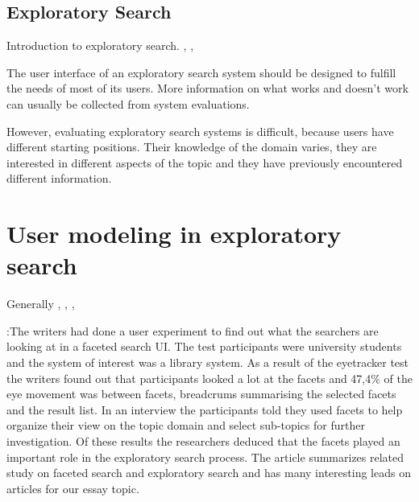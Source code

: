 \documentclass{sigchi}
\begin{document}
\subsection{Exploratory Search}
Introduction to exploratory search.
\cite{march06}, \cite{white09}, \cite{tvaro11}



The user interface of an exploratory search system should be designed to fulfill the needs of most of its users. More information on what works and doesn't work can usually be collected from system evaluations.

However, evaluating exploratory search systems is difficult, because users have different starting positions. Their knowledge of the domain varies, they are interested in different aspects of the topic and they have previously encountered different information. \cite{kules08}

\section{User modeling in exploratory search}
Generally
\cite{oconnor10}, \cite{sugi04}, \cite{white07}, \cite{kules09}

\cite{kules09}:The writers had done a user experiment to find out what  the searchers are  looking at in a faceted search UI. The test participants were  university students and the system of interest was a library system. As a result  of the eyetracker test the writers found out that participants looked a lot at the facets and  47,4\% of the  eye movement  was between facets, breadcrums summarising the selected facets and the result list. In an interview the participants told they used facets to help organize their view on the topic domain and select sub-topics for further investigation. Of these results the researchers deduced that the facets played an important role in the exploratory search process. 
The article summarizes related study on faceted search and exploratory search and has many interesting leads on articles for our essay topic.
\end{document}
